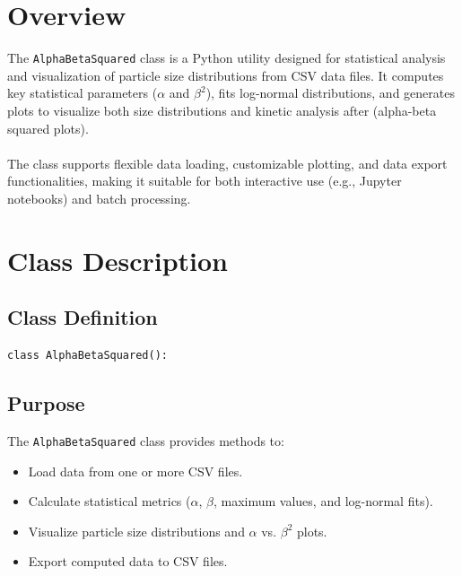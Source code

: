\documentclass[
	ngerman,							%
	a4paper,							%
	11pt,							%
	oneside							%
	]{article}							%
\begin{document}
\section{Overview}
The \texttt{AlphaBetaSquared} class is a Python utility designed for
statistical analysis and visualization of particle size distributions
from CSV data files. It computes key statistical parameters ($\alpha$
and $\beta^2$), fits log-normal distributions, and generates plots to
visualize both size distributions and kinetic analysis after
 (alpha-beta squared plots).\\
\ \\
\noindent
The class supports flexible data loading, customizable plotting, and data export functionalities, making it suitable for both interactive use (e.g., Jupyter notebooks) and batch processing.

\section{Class Description}
\subsection*{Class Definition}
\begin{lstlisting}
class AlphaBetaSquared():
\end{lstlisting}

\subsection*{Purpose}
The \texttt{AlphaBetaSquared} class provides methods to:
\begin{itemize}
    \item Load data from one or more CSV files.
    \item Calculate statistical metrics ($\alpha$, $\beta$, maximum values, and log-normal fits).
    \item Visualize particle size distributions and $\alpha$ vs. $\beta^2$ plots.
    \item Export computed data to CSV files.
\end{itemize}
\end{document}
